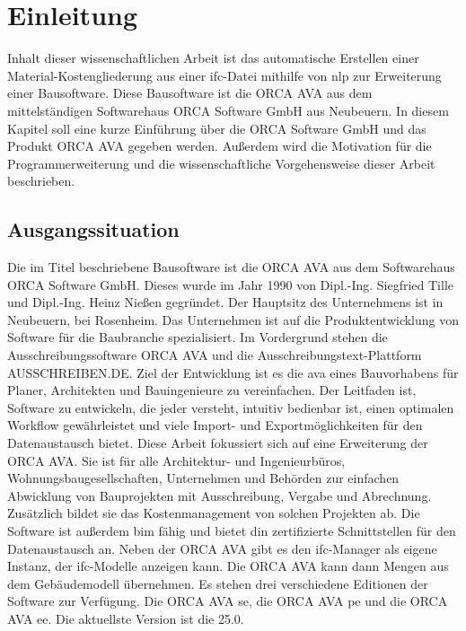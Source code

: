 \chapter{Einleitung}
\label{c:intro}

Inhalt dieser wissenschaftlichen Arbeit ist das automatische Erstellen einer Material-Kostengliederung aus einer \ac{ifc}-Datei mithilfe von \ac{nlp} zur Erweiterung einer Bausoftware. Diese Bausoftware ist die ORCA AVA aus dem mittelständigen Softwarehaus \glqq ORCA Software GmbH\grqq{} aus Neubeuern. 
In diesem Kapitel soll eine kurze Einführung über die \glqq ORCA Software GmbH\grqq{} und das Produkt  ORCA AVA gegeben werden. Außerdem wird die Motivation für die Programmerweiterung und die wissenschaftliche Vorgehensweise dieser Arbeit beschrieben.

\section{Ausgangssituation}
\label{c:intro:start}

Die im Titel beschriebene Bausoftware ist die ORCA AVA aus dem Softwarehaus \glqq ORCA Software GmbH\grqq{}. Dieses wurde im Jahr 1990 von Dipl.-Ing. Siegfried Tille und Dipl.-Ing. Heinz Nießen gegründet. Der Hauptsitz des Unternehmens ist in Neubeuern, bei Rosenheim. Das Unternehmen ist auf die Produktentwicklung von Software für die Baubranche spezialisiert. Im Vordergrund stehen die Ausschreibungssoftware ORCA AVA und die Ausschreibungstext-Plattform AUSSCHREIBEN.DE. Ziel der Entwicklung ist es die \ac{ava} eines Bauvorhabens für Planer, Architekten und Bauingenieure zu vereinfachen. Der Leitfaden ist, Software zu entwickeln, die jeder versteht, intuitiv bedienbar ist, einen optimalen Workflow gewährleistet und viele Import- und Exportmöglichkeiten für den Datenaustausch bietet.
Diese Arbeit fokussiert sich auf eine Erweiterung der ORCA AVA. Sie ist für alle Architektur- und
Ingenieurbüros, Wohnungsbaugesellschaften, Unternehmen und Behörden zur einfachen Abwicklung von Bauprojekten mit Ausschreibung, Vergabe und Abrechnung. Zusätzlich bildet sie das Kostenmanagement von solchen Projekten ab. Die Software ist außerdem \ac{bim} fähig und bietet \ac{din} zertifizierte Schnittstellen für den Datenaustausch an. Neben der ORCA AVA gibt es den \ac{ifc}-Manager als eigene Instanz, der \ac{ifc}-Modelle anzeigen kann. Die ORCA AVA kann dann Mengen aus dem Gebäudemodell übernehmen.
Es stehen drei verschiedene Editionen der Software zur Verfügung. Die ORCA AVA \ac{se}, die ORCA AVA \ac{pe} und die ORCA AVA \ac{ee}. Die aktuellste Version ist die 25.0.

